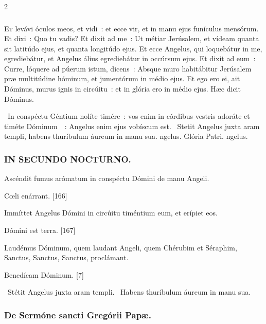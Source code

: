 \documentclass[9pt,twoside]{extarticle}
\begin{document}
\begin{multicols}{2}
{{\subsubsection*{\center {}}
\lettrine{E}t levávi óculos meos, et vidi~: et ecce vir, et in manu ejus funículus mensórum.
Et dixi~: Quo tu vadis? Et dixit ad me~: Ut métiar Jerúsalem, et vídeam quanta sit latitúdo ejus, et quanta longitúdo ejus.
Et ecce Angelus, qui loquebátur in me, egrediebátur, et Angelus álius egrediebátur in occúrsum ejus.
Et dixit ad eum~: Curre, lóquere ad púerum istum, dicens~: Absque muro habitábitur Jerúsalem præ multitúdine hóminum, et jumentórum in médio ejus.
Et ego ero ei, ait Dóminus, murus ignis in circúitu~: et in glória ero in médio ejus. Hæc dicit Dóminus.

\begin{tightlist}{}
\item {}~In conspéctu Géntium nolíte timére~: vos enim in córdibus vestris adoráte et timéte Dóminum~~: \textred{*} Angelus enim ejus vobíscum est. ~Stetit Angelus juxta aram templi, habens thuríbulum áureum in manu sua. ngelus. Glória Patri. ngelus.
\end{tightlist}

\subsubsection*{\center \textsc{IN SECUNDO NOCTURNO.}}
\begin{tightlist}{}
\item {} Ascéndit fumus arómatum in conspéctu Dómini de manu Angeli.
\item {} Cœli enárrant. [166]
\item {} Immíttet Angelus Dómini in circúitu timéntium eum, et erípiet eos.
\item {} Dómini est terra. [167]
\item {} Laudémus Dóminum, quem laudant Angeli, quem Chérubim et Séraphim, Sanctus, Sanctus, Sanctus, proclámant.
\item {} Benedícam Dóminum. [7]
\item {}~Stétit Angelus juxta aram templi. ~Habens thuríbulum áureum in manu sua.
\end{tightlist}

\subsubsection*{\center De Sermóne sancti Gregórii Papæ.}
}}
\end{multicols}
\end{document}
